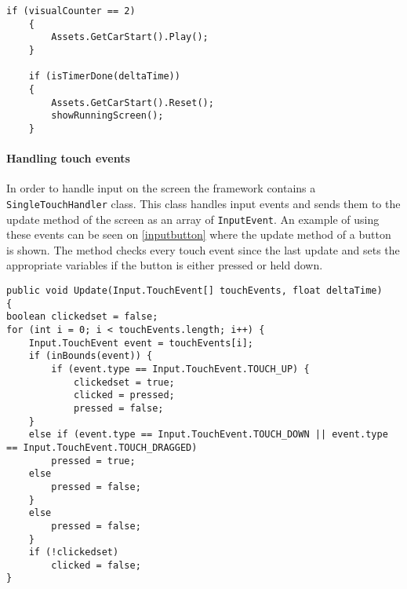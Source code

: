 \begin{lstlisting}[caption=Playing a sound, label=playsound]
	if (visualCounter == 2) 
	{
		Assets.GetCarStart().Play();
	}

	if (isTimerDone(deltaTime)) 
	{
		Assets.GetCarStart().Reset();
		showRunningScreen();
	}
\end{lstlisting}

\paragraph{Handling touch events}
In order to handle input on the screen the framework contains a \lstinline|SingleTouchHandler| class.
This class handles input events and sends them to the update method of the screen as an array of \lstinline|InputEvent|.
An example of using these events can be seen on \cref{inputbutton} where the update method of a button is shown. 
The method checks every touch event since the last update and sets the appropriate variables if the button is either pressed or held down.

\begin{lstlisting}[caption=Implementation of an ingame button, label=inputbutton]
public void Update(Input.TouchEvent[] touchEvents, float deltaTime) 
{
boolean clickedset = false;
for (int i = 0; i < touchEvents.length; i++) {
	Input.TouchEvent event = touchEvents[i];
	if (inBounds(event)) {
		if (event.type == Input.TouchEvent.TOUCH_UP) {
			clickedset = true;
			clicked = pressed;
			pressed = false;
	}
	else if (event.type == Input.TouchEvent.TOUCH_DOWN || event.type == Input.TouchEvent.TOUCH_DRAGGED)
		pressed = true;
	else
		pressed = false;
	} 
	else
		pressed = false;
	}
	if (!clickedset)
		clicked = false;
}
\end{lstlisting}

